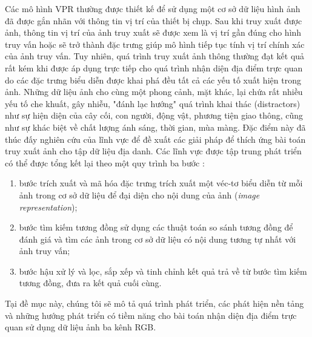 Các mô hình VPR thường được thiết kế để sử dụng một cơ sở dữ liệu hình ảnh đã được gắn nhãn với thông tin vị trí của thiết bị chụp. Sau khi truy xuất được ảnh, thông tin vị trí của ảnh truy xuất sẽ được xem là vị trí gần đúng cho hình truy vấn hoặc sẽ trở thành đặc trưng giúp mô hình tiếp tục tính vị trí chính xác của ảnh truy vấn. Tuy nhiên, quá trình truy xuất ảnh thông thường đạt kết quả rất kém khi được áp dụng trực tiếp cho quá trình nhận diện địa điểm trực quan do các đặc trưng biểu diễn được khai phá đều tất cả các yếu tố xuất hiện trong ảnh. Những dữ liệu ảnh cho cùng một phong cảnh, mặt khác, lại chứa rất nhiều yếu tố che khuất, gây nhiễu, "đánh lạc hướng" quá trình khai thác (distractors) như sự hiện diện của cây cối, con người, động vật, phương tiện giao thông, cũng như sự khác biệt về chất lượng ánh sáng, thời gian, mùa màng. Đặc điểm này đã thúc đấy nghiên cứu của lĩnh vực để đề xuất các giải pháp để thích ứng bài toán truy xuất ảnh cho tập dữ liệu địa danh. Các lĩnh vực được tập trung phát triển có thể được tổng kết lại theo một quy trình ba bước \cite{Masone2021ASO}:

\begin{enumerate}
    \item bước trích xuất và mã hóa đặc trưng trích xuất một véc-tơ biểu diễn từ mỗi ảnh trong cơ sở dữ liệu để đại diện cho nội dung của ảnh (\textit{image representation});
    \item bước tìm kiếm tương đồng sử dụng các thuật toán so sánh tương đồng để đánh giá và tìm các ảnh trong cơ sở dữ liệu có nội dung tương tự nhất với ảnh truy vấn;
    \item bước hậu xử lý và lọc, sắp xếp và tinh chỉnh kết quả trả về từ bước tìm kiếm tương đồng, đưa ra kết quả cuối cùng.
\end{enumerate}

Tại đề mục này, chúng tôi sẽ mô tả quá trình phát triển, các phát hiện nền tảng và những hướng phát triển có tiềm năng cho bài toán nhận diện địa điểm trực quan sử dụng dữ liệu ảnh ba kênh RGB.













